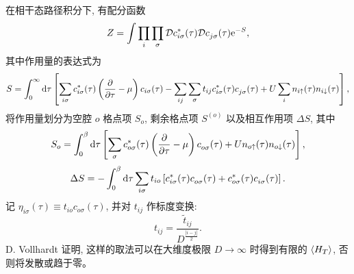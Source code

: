 在相干态路径积分下, 有配分函数 
\begin{equation}
    Z=\int\prod_{i}\prod_\sigma \mathcal{D}c_{i\sigma}^*(\tau)\mathcal{D}c_{j\sigma}^{ }(\tau)\mathrm{e}^{-S},
\end{equation}
其中作用量的表达式为
\begin{equation}
    S=\int_0^\infty\mathrm{d}\tau\left[ \sum_{i\sigma}c_{i\sigma}^*(\tau)\left( \frac{\partial}{\partial \tau}-\mu \right) c_{i\sigma}(\tau)-\sum_{ij}\sum_\sigma t_{ij}c_{i\sigma}^*(\tau)c_{j\sigma}^{ }(\tau)+U\sum_i n_{i\uparrow}(\tau)n_{i\downarrow}(\tau) \right],
\end{equation}
将作用量划分为空腔 $o$ 格点项 $S_o$, 剩余格点项 $S^{(o)}$ 以及相互作用项 $\Delta S$, 其中 
\begin{equation}
    S_o=\int_0^\beta\mathrm{d}\tau\left[ \sum_\sigma c_{o\sigma}^*(\tau)\left( \frac{\partial}{\partial \tau}-\mu \right) c_{o\sigma}^{ }(\tau)+Un_{o\uparrow}(\tau)n_{o\downarrow}(\tau) \right],
\end{equation}
\begin{equation}
    \Delta S=-\int_0^\beta \mathrm{d}\tau\sum_{i\sigma}t_{io}\left[ c_{i\sigma}^*(\tau)c_{o\sigma}^{ }(\tau)+c_{o\sigma}^*(\tau)c_{i\sigma}^{ }(\tau) \right].
\end{equation}
记 $\eta_{i\sigma}(\tau)\equiv t_{io}c_{o\sigma}(\tau)$, 并对 $t_{ij}$ 作标度变换:
\begin{equation}
    t_{ij}=\frac{\tilde{t}_{ij}}{D^{\frac{|i-j|}{2}}}.
\end{equation}
D. Vollhardt 证明, 这样的取法可以在大维度极限 $D\to \infty$ 时得到有限的 $\langle H_T \rangle$, 否则将发散或趋于零\cite{PhysRevLett.62.324}。

